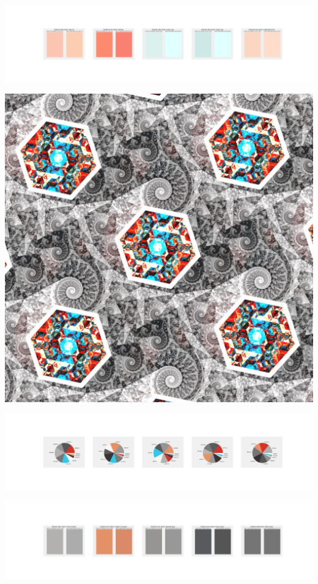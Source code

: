 \documentclass[11pt]{article}
\begin{document}
\begin{landscape}
    \begin{center}
    \includegraphics[width=250mm]{./nbimg/peak-335.jpg}
    \end{center}
    

    \begin{center}
    \includegraphics[width=\textwidth]{./nbimg/file (401).jpg}
    \end{center}

    \begin{center}
    \includegraphics[width=250mm]{./nbimg/pie-336.jpg}
    \end{center}

    \begin{center}
    \includegraphics[width=250mm]{./nbimg/peak-336.jpg}
    \end{center}
    


\end{landscape}
\end{document}

